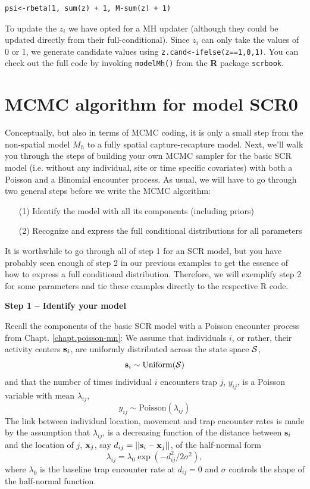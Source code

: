 \begin{verbatim}
psi<-rbeta(1, sum(z) + 1, M-sum(z) + 1)
\end{verbatim}

To update the $z_{i}$ we have opted for a MH updater
(although they could be updated directly from their
full-conditional). Since $z_{i}$ can only take the values of 0 or 1, we generate candidate values using \verb#z.cand<-ifelse(z==1,0,1)#.
You can check out the full code by invoking \mbox{\tt modelMh()} from the {\bf R} package \mbox{\tt scrbook}.

\section{MCMC algorithm for model SCR0}

Conceptually, but also in terms of MCMC coding, it is only a small
step from the non-spatial model $M_h$ to a fully spatial
capture-recapture model. Next, we'll walk you through the steps of
building your own MCMC sampler for the basic SCR model (i.e. without
any individual, site or time specific covariates) with both a Poisson
and a Binomial encounter process.  As usual, we will have to go
through two general steps before we write the MCMC algorithm:
\begin{itemize}
\item[  (1)] Identify the model with all its components (including
    priors)
\item[  (2)] Recognize and express the full conditional distributions for
    all parameters
\end{itemize}
It is worthwhile to go through all of step 1 for an SCR model, but you
have probably seen enough of step 2 in our previous examples to get
the essence of how to express a full conditional
distribution. Therefore, we will exemplify step 2 for some parameters
and tie these examples directly to the respective R code.

{\bf Step 1 -- Identify your model}

Recall the components of the basic SCR model with a Poisson encounter process from Chapt. \ref{chapt.poisson-mn}:
We assume that individuals $i$, or rather, their activity centers
${\bf s}_i$, are uniformly distributed across the state space ${\cal S}$,
\[
{\bf s}_i  \sim \mbox{Uniform}({\cal S})
\]
and that the number of times individual $i$ encounters trap $j$, $y_{ij}$, is a Poisson variable with mean $\lambda_{ij}$,
\[
y_{ij} \sim \mbox{Poisson}(\lambda_{ij})
\]
The link between individual location, movement and trap encounter
rates is made by the assumption that $\lambda_{ij}$, is a decreasing
function of the distance between ${\bf s}_i$ and the location of $j$,
${\bf x}_{j}$, say $d_{ij} = ||{\bf s}_{i} - {\bf x}_{j}||$, of the half-normal form
\[
\lambda_{ij} =  \lambda_0  \exp(-d_{ij}^2/2\sigma^2),
\]
where $\lambda_0$ is the baseline trap encounter rate at $d_{ij}=0$ and $\sigma$ controls the shape of the half-normal function.

